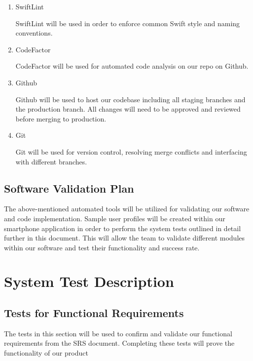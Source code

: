 \documentclass[12pt, titlepage]{article}
\begin{document}
\begin{enumerate}

\item SwiftLint

\subitem SwiftLint will be used in order to enforce common Swift style and naming conventions.

\item CodeFactor

\subitem CodeFactor will be used for automated code analysis on our repo on Github.

\item Github

\subitem Github will be used to host our codebase including all staging branches and the production branch. All changes will need to be approved and reviewed before merging to production.

\item Git

\subitem Git will be used for version control, resolving merge conflicts and interfacing with different branches.

\end{enumerate}

\subsection{Software Validation Plan}

The above-mentioned automated tools will be utilized for validating our software and code implementation. Sample user profiles will be created within our smartphone application in order to perform the system tests outlined in detail further in this document. This will allow the team to validate different modules within our software and test their functionality and success rate. 

\section{System Test Description}
	
\subsection{Tests for Functional Requirements}
\label{Section 5.1}

The tests in this section will be used to confirm and validate our functional requirements from the SRS document. Completing these tests will prove the functionality of our product
\end{document}
